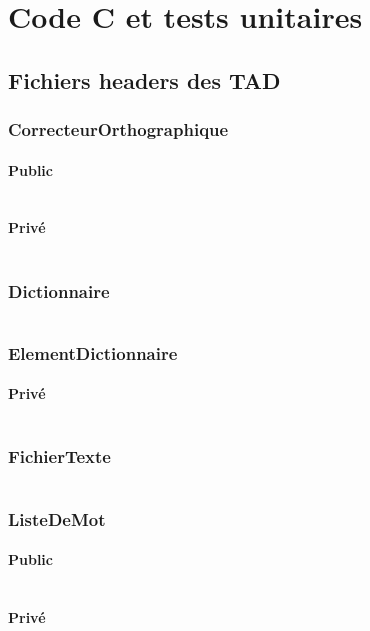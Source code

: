\documentclass[12pt,titlepage,a4paper]{report}
\newcommand{\inputCodeH}[1]{\inputminted[tabsize=4,linenos]{c}{../programme/include/#1.h}}
\begin{document}

\part{Code C et tests unitaires}
\chapter{Fichiers headers des TAD}
\minitoc
\section{CorrecteurOrthographique}
	\subsection{Public}					\inputCodeH{TADCorrecteurOrthographique}
	\subsection{Privé}					\inputCodeH{TADCorrecteurOrthographiquePrive}
\section{Dictionnaire}					\inputCodeH{TADDictionnaire}
\section{ElementDictionnaire}			
	\subsection{Privé}					\inputCodeH{TADElementDictionnairePrive}
\section{FichierTexte}					\inputCodeH{TADFichierTexte}
\section{ListeDeMot}					
	\subsection{Public}					\inputCodeH{TADListeDeMot}
	\subsection{Privé}					\inputCodeH{TADListeDeMotPrive}
\end{document}
